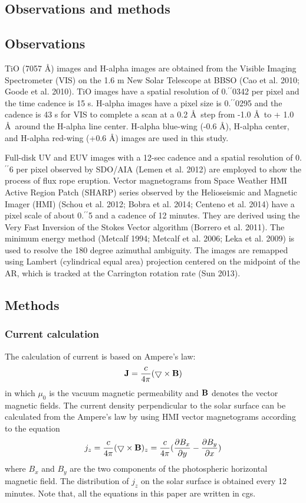 \documentclass[12pt,preprint]{aastex}
\begin{document}
\begin{CJK*}{UTF8}{gbsn}
\section{Observations and methods}
\subsection{Observations}
TiO (7057 \AA) images and H-alpha images are obtained from the Visible Imaging Spectrometer (VIS) on the 1.6 m New Solar Telescope at BBSO (Cao et al. 2010; Goode et al. 2010). TiO images have a spatial resolution of 0.$^\prime$$^\prime$0342  per pixel and the time cadence is 15 s. H-alpha images have a pixel size is 0.$^\prime$$^\prime$0295 and the cadence is 43 s for VIS to complete a scan at a 0.2 \AA\ step from -1.0 \AA\ to + 1.0 \AA\ around the H-alpha line center. H-alpha blue-wing (-0.6 \AA), H-alpha center, and H-alpha red-wing (+0.6 \AA) images are used in this study.

Full-disk UV and EUV images with a 12-sec cadence and a spatial resolution of 0.$^\prime$$^\prime$6  per pixel observed by SDO/AIA (Lemen et al. 2012) are employed to show the process of flux rope eruption. Vector magnetograms from Space Weather HMI Active Region Patch (SHARP) series observed by the Helioseismic and Magnetic Imager (HMI) (Schou et al. 2012; Bobra et al. 2014; Centeno et al. 2014) have a pixel scale of about 0.$^\prime$$^\prime$5 and a cadence of 12 minutes. They are derived using the Very Fast Inversion of the Stokes Vector algorithm (Borrero et al. 2011). The minimum energy method (Metcalf 1994; Metcalf et al. 2006; Leka et al. 2009) is used to resolve the 180 degree azimuthal ambiguity. The images are remapped using Lambert (cylindrical equal area) projection centered on the midpoint of the AR, which is tracked at the Carrington rotation rate (Sun 2013). 
\subsection{Methods}
\subsubsection{Current calculation} 
The calculation of current is based on Ampere's law:
\begin{equation}\label{equation1}
{\bf J}=\frac{c}{4\pi}(\bigtriangledown \times {\bf B})
\end{equation}
in which $\mu_0$ is the vacuum magnetic permeability and ${\bf B}$ denotes the vector magnetic fields. The current density perpendicular to the solar surface can be calculated from the Ampere's law by using HMI vector magnetograms according to the equation
\begin{equation}\label{equation2}
j_z=\frac{c}{4\pi}(\bigtriangledown \times {\bf B})_z=\frac{c}{4\pi}(\frac{\partial B_x}{\partial y}-\frac{\partial B_y}{\partial x})
\end{equation}
where $B_x$ and $B_y$ are the two components of the  photospheric horizontal magnetic field.
The distribution of $j_z$ on the solar surface is obtained every 12 minutes. Note that, all the equations in this paper are written in cgs.


\end{CJK*}
\end{document}
